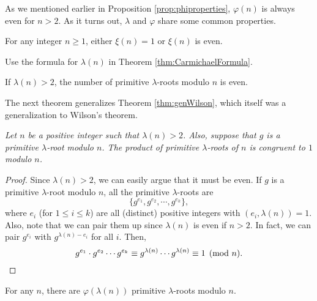 \documentclass{subfile}
\begin{document}
	As we mentioned earlier in Proposition \ref{prop:phiproperties}, $\varphi(n)$ is always even for $n>2$. As it turns out, $\lambda$ and $\varphi$ share some common properties.
	\begin{problem}
		For any integer $n\geq 1$, either $\xi(n)=1$ or $\xi(n)$ is even.
	\end{problem}

	\begin{hint}
		Use the formula for $\lambda(n)$ in Theorem \ref{thm:CarmichaelFormula}.
	\end{hint}

	\begin{problem}
		If $\lambda(n)>2$, the number of primitive $\lambda$-roots modulo $n$ is even.
	\end{problem}

	The next theorem generalizes Theorem \ref{thm:genWilson}, which itself was a generalization to Wilson's theorem. 
	\begin{theorem}\slshape
		Let $n$ be a positive integer such that $\lambda(n)>2$. Also, suppose that $g$ is a primitive $\lambda$-root modulo $n$. The product of primitive $\lambda$-roots of $n$ is congruent to $1$ modulo $n$.
	\end{theorem}
	
	\begin{proof}
		Since $\lambda(n)>2$, we can easily argue that it must be even. If $g$ is a primitive $\lambda$-root modulo $n$, all the primitive $\lambda$-roots are $$\{g^{e_1}, g^{e_2}, \cdots, g^{e_{k}}\},$$ where $e_i$ (for $1 \leq i \leq k$) are all (distinct) positive integers with $(e_i, \lambda(n))=1$. Also, note that we can pair them up since $\lambda(n)$ is even if $n>2$. In fact, we can pair $g^{e_i}$ with $g^{\lambda(n)-e_i}$ for all $i$. Then,
		\begin{equation*}
		g^{e_1}\cdot g^{e_2}\cdots g^{e_k}  \equiv g^{\lambda(n)}\cdots g^{\lambda(n)}  \equiv 1\pmod n. \qedhere
		\end{equation*}
	\end{proof}
	
	\begin{corollary}
		For any $n$, there are $\varphi(\lambda(n))$ primitive $\lambda$-roots modulo $n$.
	\end{corollary}
	
\end{document}
